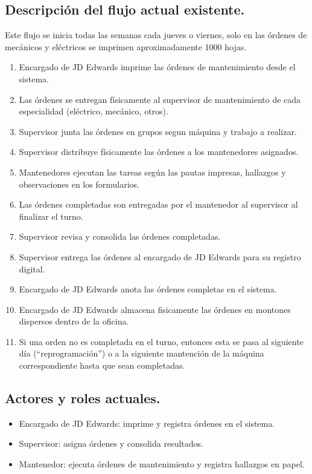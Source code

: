 \documentclass[10pt,a4paper]{report}
\begin{document}
\subsection*{Descripción del flujo actual existente.}
Este flujo se inicia todas las semanas cada jueves o viernes, solo en las órdenes de mecánicos y eléctricos se imprimen aproximadamente 1000 hojas.
\begin{enumerate}
    \item Encargado de JD Edwards imprime las órdenes de mantenimiento desde el sistema.
    \item Las órdenes se entregan físicamente al supervisor de mantenimiento de cada especialidad (eléctrico, mecánico, otros).
    \item Supervisor junta las órdenes en grupos segun máquina y trabajo a realizar.
    \item Supervisor distribuye físicamente las órdenes a los mantenedores asignados.
    \item Mantenedores ejecutan las tareas según las pautas impresas, hallazgos y observaciones en los formularios.
    \item Las órdenes completadas son entregadas por el mantenedor al supervisor al finalizar el turno.
    \item Supervisor revisa y consolida las órdenes completadas.
    \item Supervisor entrega las órdenes al encargado de JD Edwards para su registro digital.
    \item Encargado de JD Edwards anota las órdenes completas en el sistema.
    \item Encargado de JD Edwards almacena fisicamente las órdenes en montones dispersos dentro de la oficina.
    \item Si una orden no es completada en el turno, entonces esta se pasa al siguiente día (``reprogramación'') o a la siguiente mantención de la máquina correspondiente hasta que sean completadas.
\end{enumerate}


\subsection*{Actores y roles actuales.}
\begin{itemize}
    \item Encargado de JD Edwards: imprime y registra órdenes en el sistema.
    \item Supervisor: asigna órdenes y consolida resultados.
    \item Mantenedor: ejecuta órdenes de mantenimiento y registra hallazgos en papel.
\end{itemize}
\end{document}
